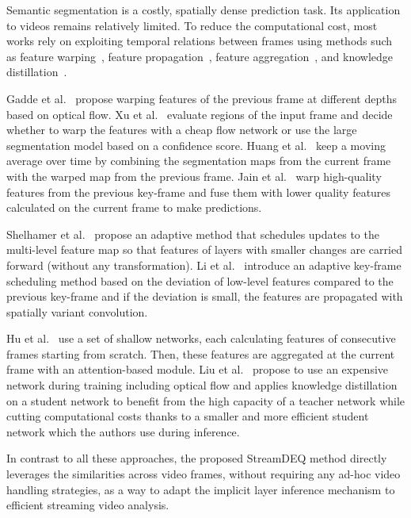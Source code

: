 \documentclass[runningheads]{llncs}
\begin{document}
Semantic segmentation is a costly, spatially dense prediction task. Its application to videos remains relatively limited. To reduce the computational cost, most works rely on exploiting temporal relations between frames using methods such as feature warping~\cite{gadde2017semantic,xu2018dynamic,huang2018efficient,jain2019accel}, feature propagation~\cite{shelhamer2016clocknet,li2018low}, feature aggregation~\cite{hu2020temporally}, and knowledge distillation~\cite{liu2020efficient}. 


Gadde et al.~\cite{gadde2017semantic} propose warping features of the previous frame at different depths based on optical flow. Xu et al.~\cite{xu2018dynamic} evaluate regions of the input frame and decide whether to warp the features with a cheap flow network or use the large segmentation model based on a confidence score. Huang et al.~\cite{huang2018efficient} keep a moving average over time by combining the segmentation maps from the current frame with the warped map from the previous frame. Jain et al.~\cite{jain2019accel} warp high-quality features from the previous key-frame and fuse them with lower quality features calculated on the current frame to make predictions. 


Shelhamer et al.~\cite{shelhamer2016clocknet} propose an adaptive method that schedules updates to the multi-level feature map so that features of layers with smaller changes are carried forward (without any transformation). Li et al.~\cite{li2018low} introduce an adaptive key-frame scheduling method based on the deviation of low-level features compared to the previous key-frame and if the deviation is small, the features are propagated with spatially variant convolution. 


Hu et al.~\cite{hu2020temporally} use a set of shallow networks, each calculating features of consecutive frames starting from scratch. Then, these features are aggregated at the current frame with an attention-based module. Liu et al.~\cite{liu2020efficient} propose to use an expensive network during training including optical flow and applies knowledge distillation on a student network to benefit from the high capacity of a teacher network while cutting computational costs thanks to a smaller and more efficient student network which the authors use during inference. 


In contrast to all these approaches, the proposed StreamDEQ method directly leverages the similarities across video frames, without requiring any ad-hoc video handling strategies, as a way to adapt the implicit layer inference mechanism to efficient streaming video analysis.
\end{document}
